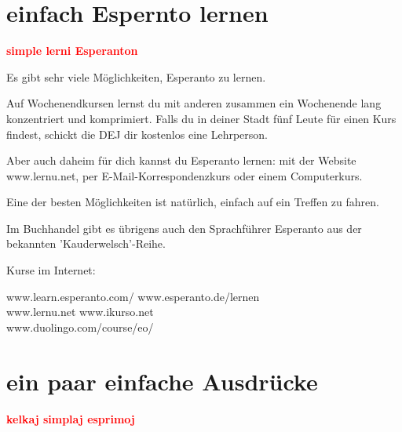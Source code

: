 \section{einfach Espernto lernen}

\vspace{-.3cm}

\begin{flushright}
\textbf{\large \textcolor{red}{simple lerni Esperanton}}
\end{flushright}

\vspace{-.3cm}

{\centering
	Es gibt sehr viele Möglichkeiten, Esperanto zu lernen.
} 

Auf Wochenendkursen lernst du mit anderen zusammen ein Wochenende lang konzentriert und komprimiert. Falls du in deiner Stadt fünf Leute für einen Kurs findest, schickt die DEJ dir kostenlos eine Lehrperson. 

Aber auch daheim für dich kannst du Esperanto lernen: mit der Website www.lernu.net, per E-Mail-Korrespondenzkurs oder einem Computerkurs. 

Eine der besten Möglichkeiten ist natürlich, einfach auf ein Treffen zu fahren. 

Im Buchhandel gibt es übrigens auch den Sprachführer Esperanto aus der bekannten 'Kauderwelsch'-Reihe.

Kurse im Internet:

{
	\begin{addmargin}[.5em]{.3em}
	www.learn.esperanto.com/ \hfill www.esperanto.de/lernen \\
	www.lernu.net \hfill www.ikurso.net \\
	www.duolingo.com/course/eo/ 
	\end{addmargin}
}

\vspace{-.4cm}

\section{ein paar einfache Ausdrücke}

\vspace{-.3cm}

\begin{flushright}
\textbf{\large{\textcolor{red}{kelkaj simplaj esprimoj}}}
\end{flushright}

\vspace{-.3cm}


